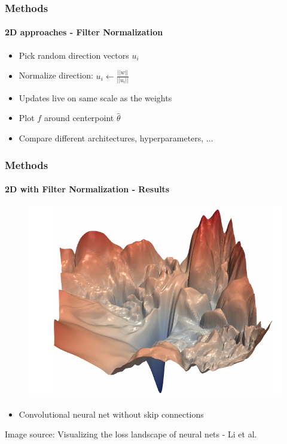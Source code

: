 \documentclass[9pt]{beamer}
\begin{document}
\begin{frame}
\frametitle{Methods}
\framesubtitle{2D approaches - Filter Normalization}
\begin{itemize}
	\item Pick random direction vectors $u_i$ 
	\item Normalize direction: $u_i \leftarrow \frac{||w||}{||u_i||}$
	\item Updates live on same scale as the weights
	\item Plot $f$ around centerpoint $\hat{\theta}$
	\item Compare different architectures, hyperparameters, ...
\end{itemize}
\end{frame}

\begin{frame}
\frametitle{Methods}
\framesubtitle{2D with Filter Normalization - Results}
\begin{figure}
	\includegraphics[width=0.8\linewidth]{figures/vgg_loss.png}
\end{figure}
\begin{itemize}
	\item Convolutional neural net without skip connections
\end{itemize}
\tiny\color{lightgray}Image source: Visualizing the loss landscape of neural nets - Li et al.
\end{frame} 
\end{document}
